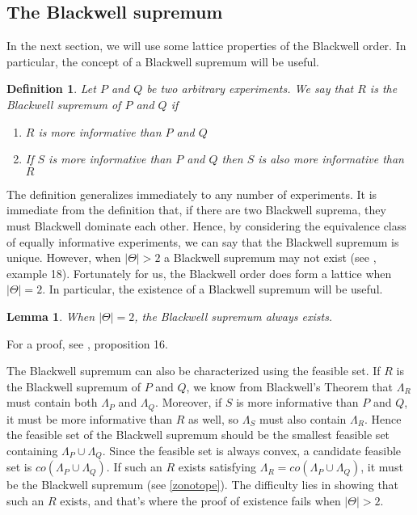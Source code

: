 \documentclass[11pt]{article}
\theoremstyle{plain}
\newtheorem{lem}{Lemma}
\newtheorem{defn}{Definition}
\theoremstyle{remark}
\begin{document}
\subsection{The Blackwell supremum}

In the next section, we will use some lattice properties of the Blackwell order. In particular, the concept of a Blackwell supremum will be useful.
\begin{defn}
Let $P$ and $Q$ be two arbitrary experiments. We say that $R$ is the Blackwell supremum of $P$ and $Q$ if
\begin{enumerate}
    \item $R$ is more informative than $P$ and $Q$
    \item If $S$ is more informative than $P$ and $Q$ then $S$ is also more informative than $R$
\end{enumerate}
\end{defn}
The definition generalizes immediately to any number of experiments. It is immediate from the definition that, if there are two Blackwell suprema, they must Blackwell dominate each other. Hence, by considering the equivalence class of equally informative experiments, we can say that the Blackwell supremum is unique. However, when $|\Theta|>2$ a Blackwell supremum may not exist (see \cite{bertschinger2014blackwell}, example 18). Fortunately for us, the Blackwell order does form a lattice when $|\Theta|=2$. In particular, the existence of a Blackwell supremum will be useful.
\begin{lem}\label{lem:blackwellsup}
When $|\Theta|=2$, the Blackwell supremum always exists. 
\end{lem}
For a proof, see \cite{bertschinger2014blackwell}, proposition 16. 

The Blackwell supremum can also be characterized using the feasible set. If $R$ is the Blackwell supremum of $P$ and $Q$, we know from Blackwell's Theorem that $\Lambda_{R}$ must contain both $\Lambda_P$ and $\Lambda_Q$. Moreover, if $S$ is more informative than $P$ and $Q$, it must be more informative than $R$ as well, so $\Lambda_S$ must also contain $\Lambda_{R}$. Hence the feasible set of the Blackwell supremum should be the smallest feasible set containing $\Lambda_P\cup\Lambda_Q$. Since the feasible set is always convex, a candidate feasible set is $co(\Lambda_P\cup\Lambda_Q)$. If such an $R$ exists satisfying $\Lambda_R=co(\Lambda_P\cup\Lambda_Q)$, it must be the Blackwell supremum (see \autoref{zonotope}). The difficulty lies in showing that such an $R$ exists, and that's where the proof of existence fails when $|\Theta|>2$. 
\end{document}

